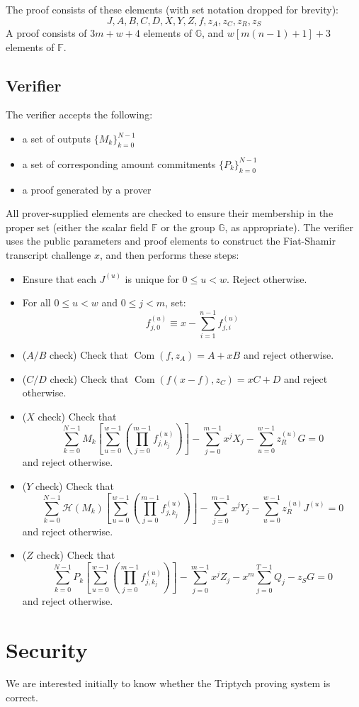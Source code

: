 \documentclass[draft]{article}
\newcommand{\G}{\mathbb{G}}
\newcommand{\F}{\mathbb{F}}
\newcommand{\hp}{\mathcal{H}}
\newcommand{\com}{\operatorname{Com}}
\newcommand{\sumj}{\sum_{j=0}^{m-1}}
\newcommand{\sumk}{\sum_{k=0}^{N-1}}
\newcommand{\sumu}{\sum_{u=0}^{w-1}}
\begin{document}
The proof consists of these elements (with set notation dropped for brevity):
$$J,A,B,C,D,X,Y,Z,f,z_A,z_C,z_R,z_S$$
A proof consists of $3m + w + 4$ elements of $\G$, and $w\left[ m(n-1) + 1 \right] + 3$ elements of $\F$.


\subsection{Verifier}
The verifier accepts the following:
\begin{itemize}
\item a set of outputs $\{M_k\}_{k=0}^{N-1}$
\item a set of corresponding amount commitments $\{P_k\}_{k=0}^{N-1}$
\item a proof generated by a prover
\end{itemize}

All prover-supplied elements are checked to ensure their membership in the proper set (either the scalar field $\F$ or the group $\G$, as appropriate). The verifier uses the public parameters and proof elements to construct the Fiat-Shamir transcript challenge $x$, and then performs these steps:
\begin{itemize}
\item Ensure that each $J^{(u)}$ is unique for $0 \leq u < w$. Reject otherwise.
\item For all $0 \leq u < w$ and $0 \leq j < m$, set: $$f^{(u)}_{j,0} \equiv x - \sum_{i=1}^{n-1} f^{(u)}_{j,i}$$
\item{($A/B$ check)} Check that $\com(f,z_A) = A + xB$ and reject otherwise.
\item{($C/D$ check)} Check that $\com(f(x-f),z_C) = xC + D$ and reject otherwise.
\item{($X$ check)} Check that $$\sumk M_k \left[ \sumu \left( \prod_{j=0}^{m-1} f^{(u)}_{j,k_j} \right) \right] - \sumj x^jX_j - \sumu z^{(u)}_RG = 0$$ and reject otherwise.
\item{($Y$ check)} Check that $$\sumk \hp(M_k) \left[ \sumu \left( \prod_{j=0}^{m-1} f^{(u)}_{j,k_j} \right) \right] - \sumj x^jY_j - \sumu z^{(u)}_RJ^{(u)} = 0$$ and reject otherwise.
\item{($Z$ check)} Check that $$\sumk P_k \left[ \sumu \left( \prod_{j=0}^{m-1} f^{(u)}_{j,k_j} \right) \right] - \sumj x^jZ_j - x^m\sum_{j=0}^{T-1} Q_j - z_SG = 0$$ and reject otherwise.
\end{itemize}


\section{Security}
We are interested initially to know whether the Triptych proving system is correct.
\end{document}
